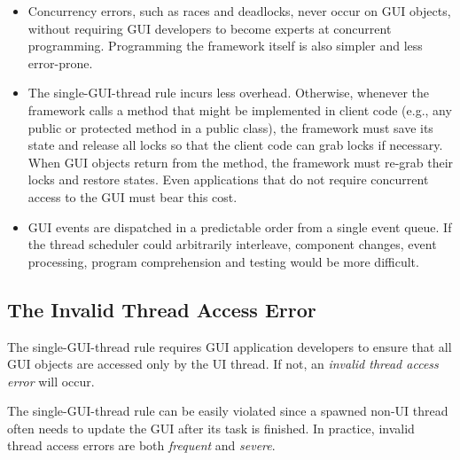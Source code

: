 \begin{itemize}

\item Concurrency errors, such as races and deadlocks, never occur on GUI objects, without
requiring GUI developers to become experts at concurrent programming. Programming the
framework itself is also simpler and less error-prone.

\item The single-GUI-thread rule incurs less overhead.
Otherwise, whenever the framework calls a method that might
be implemented in client code (e.g., any public or protected method in a public class),
the framework must save its state and release all locks so that the client code can grab locks
if necessary. When GUI objects return from the method, the framework must re-grab their locks and
restore states.  Even applications that do not require concurrent access to the GUI
must bear this cost.

\item GUI events are dispatched in a predictable order from a single event queue.
If the thread scheduler could arbitrarily interleave, component changes, event processing,
program comprehension and testing would be more difficult.
\end{itemize}


\subsection{The Invalid Thread Access Error}

The single-GUI-thread rule requires GUI application developers to
 ensure that all GUI objects are accessed only by the UI thread.
If not, an \textit{invalid thread access error} will occur.

The single-GUI-thread rule can be easily violated since a spawned non-UI thread often needs to update
the GUI  after its  task is finished.
In practice, invalid thread access errors are both \textit{frequent} and \textit{severe}.


